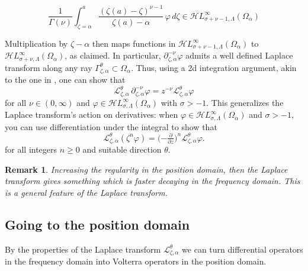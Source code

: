 \documentclass{article}
\theoremstyle{plain}
\newtheorem{rmk}{Remark}
\newcommand{\laplace}{\mathcal{L}}
\newcommand{\fracderiv}[3]{\partial^{#1}_{#2, #3}}
\newcommand{\singexp}[2]{\mathcal{H}L^\infty_{#1, #2}}
\newcommand{\domain}{\Omega}
\begin{document}
\[ \frac{1}{\Gamma(\nu)}\int_{\zeta=\alpha}^a \frac{(\zeta(a)-\zeta)^{\nu-1}}{\zeta(a)- \alpha}\, \varphi \, d\zeta \in \singexp{\sigma+\nu-1}{\Lambda}(\domain_\alpha) \]

Multiplication by $\zeta - \alpha$ then maps functions in $\singexp{\sigma+\nu-1}{\Lambda}(\domain_\alpha)$ to $\singexp{\sigma+\nu}{\Lambda}(\domain_\alpha)$, as claimed. In particular, $\fracderiv{-\nu}{\zeta}{\alpha}\varphi$ admits a well defined Laplace transform along any ray $\Gamma_{\zeta,\alpha}^{\theta}\subset\domain_\alpha$. Thus, using a 2d integration argument, akin to the one in \cite[Theorem~2.39]{laplace-tfm}, one can show that 
\[ \laplace_{\zeta,\alpha}^{\theta}\,\fracderiv{-\nu}{\zeta}{\alpha} \varphi = z^{-\nu} \laplace_{\zeta, \alpha}^{\theta} \varphi \]
for all $\nu \in (0, \infty)$ and $\varphi\in\singexp{\sigma}{\Lambda}(\domain_\alpha)$ with $\sigma>-1$. This generalizes the Laplace transform's action on derivatives: when $\varphi \in \singexp{\sigma}{\Lambda}(\domain_\alpha)$ and $\sigma>-1$, you can use differentiation under the integral to show that~\cite[Theorem~1.34]{laplace-tfm}
\begin{equation}%
\laplace_{\zeta,\alpha}^\theta (\zeta^n \varphi) = \big({-\tfrac{\partial}{\partial z}}\big)^n \laplace_{\zeta,\alpha}^\theta \varphi.
\end{equation}
for all integers $n \ge 0$ and suitable direction $\theta$.

\begin{rmk}
    Increasing the regularity in the position domain, then the Laplace transform gives something which is faster decaying in the frequency domain. This is a general feature of the Laplace transform.
\end{rmk}

\subsection{Going to the position domain}

By the properties of the Laplace transform $\laplace_{\zeta,\alpha}^{\theta}$ we can turn differential operators in the frequency domain into Volterra operators in the position domain. 
\end{document}
